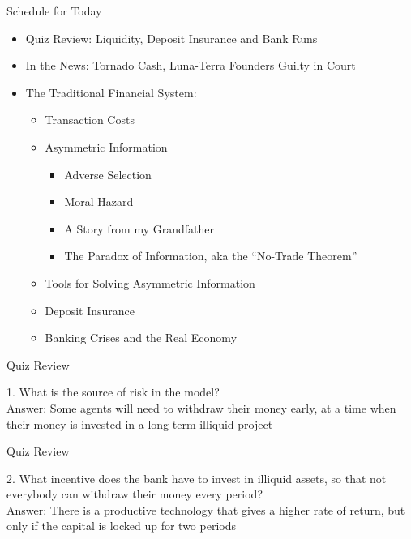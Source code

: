 \documentclass[aspectratio=169]{beamer}
\begin{document}
\begin{frame}{Schedule for Today}

\begin{itemize}
    \item Quiz Review: Liquidity, Deposit Insurance and Bank Runs 
    \item In the News: Tornado Cash, Luna-Terra Founders Guilty in Court 
    \item The Traditional Financial System: 
    \begin{itemize}
        \item Transaction Costs 
        \item Asymmetric Information 
        \begin{itemize}
            \item Adverse Selection 
            \item Moral Hazard 
            \item A Story from my Grandfather 
            \item The Paradox of Information, aka the ``No-Trade Theorem'' 
        \end{itemize}
        \item Tools for Solving Asymmetric Information
        \item Deposit Insurance 
        \item Banking Crises and the Real Economy 
    \end{itemize}

\end{itemize}
    
\end{frame}

\begin{frame}{Quiz Review}

1.	What is the source of risk in the model? \pause \\ 

Answer: Some agents will need to withdraw their money early, at a time when their money is invested in a long-term illiquid project  
    
\end{frame}

\begin{frame}{Quiz Review}

2.	What incentive does the bank have to invest in illiquid assets, so that not everybody can withdraw their money every period?   \pause \\ 

Answer: There is a productive technology that gives a higher rate of return, but only if the capital is locked up for two periods 
    
\end{frame}
\end{document}
